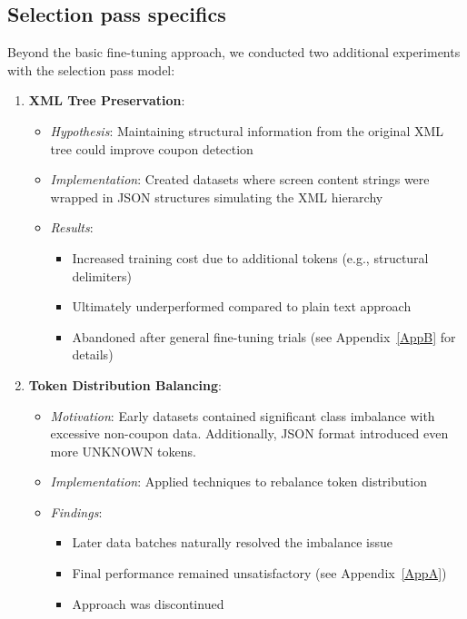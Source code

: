 \documentclass[licencjacka,en]{pracamgr}
\begin{document}
\subsection{Selection pass specifics}
Beyond the basic fine-tuning approach, we conducted two additional experiments with the selection pass model:

\begin{enumerate}
    \item \textbf{XML Tree Preservation}:
    \begin{itemize}
        \item \textit{Hypothesis}: Maintaining structural information from the original XML tree could improve coupon detection
        \item \textit{Implementation}: Created datasets where screen content strings were wrapped in JSON structures simulating the XML hierarchy
        \item \textit{Results}:
        \begin{itemize}
            \item Increased training cost due to additional tokens (e.g., structural delimiters)
            \item Ultimately underperformed compared to plain text approach
            \item Abandoned after general fine-tuning trials (see Appendix~\ref{AppB} for details)
        \end{itemize}
    \end{itemize}

    \item \textbf{Token Distribution Balancing}:
    \begin{itemize}
        \item \textit{Motivation}: Early datasets contained significant class imbalance with excessive non-coupon data. Additionally, JSON format introduced even more UNKNOWN tokens.
        \item \textit{Implementation}: Applied techniques to rebalance token distribution
        \item \textit{Findings}:
        \begin{itemize}
            \item Later data batches naturally resolved the imbalance issue
            \item Final performance remained unsatisfactory (see Appendix~\ref{AppA})
            \item Approach was discontinued
        \end{itemize}
    \end{itemize}
\end{enumerate}
\end{document}
